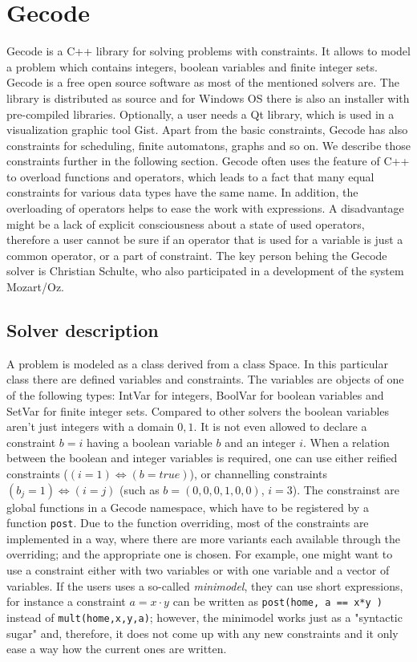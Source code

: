 \section{Gecode}

Gecode is a C++ library for solving problems with constraints. It allows to
model a problem which contains integers, boolean variables and finite integer sets. Gecode
is a free open source software as most of the mentioned solvers are. The library is
distributed as source and for Windows OS there is also an installer with
pre-compiled libraries. Optionally, a user needs a Qt library, which is used in 
a visualization graphic tool Gist. Apart from the basic constraints, Gecode has also 
constraints for scheduling, finite automatons, graphs and so on. We describe those
constraints further in the following section. Gecode often uses the feature of C++
to overload functions and operators, which leads to a fact that many equal constraints for
various data types have the same name. In addition, the overloading of operators
helps to ease the work with expressions. A disadvantage might be a lack of explicit consciousness
about a state of used operators, therefore a user cannot be sure if an operator that is used 
for a variable is just a common operator, or a part of constraint. The key person behing the Gecode 
solver is Christian Schulte, who also participated in a development of the system Mozart/Oz. 

\subsection{Solver description}
A problem is modeled as a class derived from a class Space. In this particular class
there are defined variables and constraints. The variables are objects of one of the following types:
IntVar for integers, BoolVar for boolean variables and SetVar for finite integer sets. 
Compared to other solvers the boolean variables aren't just integers with a domain ${0,1}$.
It is not even allowed to declare a constraint $b=i$ having a boolean variable $b$ and an integer $i$.
When a relation between the boolean and integer variables is required, one can use either reified constraints
($(i = 1) \Leftrightarrow (b = true)$), or channelling constraints $(b_j = 1) \Leftrightarrow (i = j)$ (such as $b = (0,0,0,1,0,0)$, $i = 3$).
The constrainst are global functions in a Gecode namespace, which have to be registered by a function \texttt{post}.
Due to the function overriding, most of the constraints are implemented in a way, 
where there are more variants each available through the overriding; and the appropriate one is chosen.
For example, one might want to use a constraint either with two variables or with one variable and 
a vector of variables. If the users uses a so-called {\em minimodel}, they can use short expressions,
for instance a constraint $a = x \cdot y$ can be written as \texttt{post(home, a == x*y )} instead of \texttt{mult(home,x,y,a)}; 
however, the minimodel works just as a "syntactic sugar" and, therefore, it does not come up 
with any new constraints and it only ease a way how the current ones are written. 

